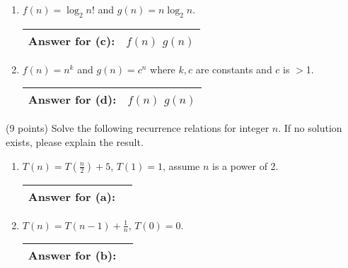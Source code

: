 \documentclass[11pt]{article}
\begin{document}
\begin{problems}
\begin{enumerate}
\item $f(n) =\log_2 n!$ and $g(n) =n \log_2 n$.
\vspace{.25in}
\begin{table}[!h]  \flushright \renewcommand{\arraystretch}{2}  \begin{tabular}{|l|c| } \hline
Answer for (c): & \hspace{.15in} $f(n)$ \hspace{.5in} $g(n)$ \hspace{.15in}\\
\hline \end{tabular} \end{table}

\item $f(n) = n^k$ and $g( n)=c^n$ where $k,c$ are constants and $c$ is $>$1.
\vspace{.25in}
\begin{table}[!h]  \flushright \renewcommand{\arraystretch}{2}  \begin{tabular}{|l|c| } \hline
Answer for (d): &  \hspace{.15in} $f(n)$ \hspace{.5in} $g(n)$ \hspace{.15in}\\
\hline \end{tabular} \end{table}

\end{enumerate}


 \item (9 points) Solve the following recurrence relations for integer $n$. If
no solution exists, please explain the result.
\begin{enumerate}
\item $T(n)=T(\frac{n}{2}) + 5$, $T(1) = 1$, assume $n$ is a power of 2.
\vspace{1.5in}
\begin{table}[!h]  \flushright \renewcommand{\arraystretch}{2}  \begin{tabular}{|l|c| } \hline
Answer for (a): & \hspace{2in} \\
\hline \end{tabular} \end{table}

\item $T(n)= T(n-1) + \frac{1}{n}$, $T(0) = 0$.
\vspace{1.5in}
\begin{table}[!h]  \flushright \renewcommand{\arraystretch}{2}  \begin{tabular}{|l|c| } \hline
Answer for (b): & \hspace{2in} \\
\hline \end{tabular} \end{table}


\end{enumerate}
\end{problems}
\end{document}
